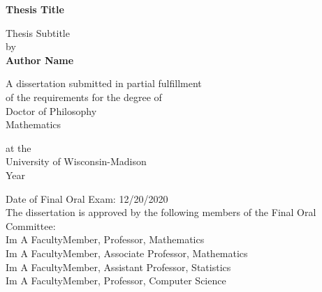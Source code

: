 \begin{titlepage}
    \begin{center}
        \vspace*{1cm}
        
        \Huge
        \textbf{Thesis Title}
        
        \vspace{0.5cm}
        \LARGE
        Thesis Subtitle\\
        by\\
    
        \textbf{Author Name}
        
        \vfill
        
        A dissertation submitted in partial fulfillment\\
        of the requirements for the degree of\\
        Doctor of Philosophy\\
        Mathematics\\
    
        
        \vspace{1.8cm}

        
        \Large
        at the\\University of Wisconsin-Madison\\
        Year\\
        \vspace{1.0cm}
        \begin{flushleft}
        \large
        Date of Final Oral Exam:  12/20/2020\\
        The dissertation is approved by the following members of the Final Oral Committee: \\
        \setlength{\parindent}{10ex}
        Im A FacultyMember, Professor, Mathematics\\Im A FacultyMember, Associate Professor, Mathematics\\ Im A FacultyMember, Assistant Professor, Statistics\\ Im A FacultyMember, Professor, Computer Science\\
        \end{flushleft}
        
    \end{center}
    
\end{titlepage}